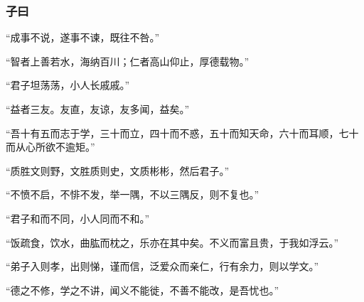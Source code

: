 \subsubsection*{子曰}

“成事不说，遂事不谏，既往不咎。”
\par

“智者上善若水，海纳百川；仁者高山仰止，厚德载物。”
\par

“君子坦荡荡，小人长戚戚。”
\par

“益者三友。友直，友谅，友多闻，益矣。”
\par

“吾十有五而志于学，三十而立，四十而不惑，五十而知天命，六十而耳顺，七十而从心所欲不逾矩。”
\par

“质胜文则野，文胜质则史，文质彬彬，然后君子。”
\par

“不愤不启，不悱不发，举一隅，不以三隅反，则不复也。”
\par

“君子和而不同，小人同而不和。”
\par

“饭疏食，饮水，曲肱而枕之，乐亦在其中矣。不义而富且贵，于我如浮云。”
\par

“弟子入则孝，出则悌，谨而信，泛爱众而亲仁，行有余力，则以学文。”
\par

“德之不修，学之不讲，闻义不能徙，不善不能改，是吾忧也。”
\par
